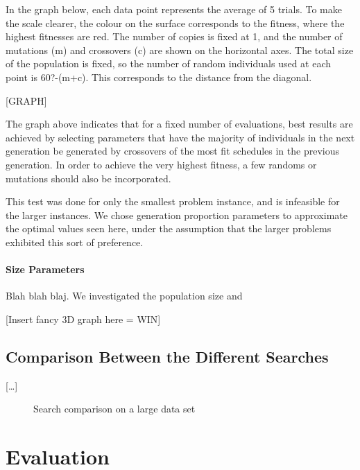 \documentclass[letterpaper]{article}
\begin{document}
        In the graph below, each data point represents the average of 5 trials. To make 
        the scale clearer, the colour on the surface corresponds to the fitness, where 
        the highest fitnesses are red. The number of copies is fixed at 1, and the number 
        of mutations (m) and crossovers (c) are shown on the horizontal axes. The total 
        size of the population is fixed, so the number of random individuals used at each 
        point is 60?-(m+c). This corresponds to the distance from the diagonal.
        
        [GRAPH]
        
        The graph above indicates that for a fixed number of evaluations, best results are 
        achieved by selecting parameters that have the majority of individuals in the next 
        generation be generated by crossovers of the most fit schedules in the previous 
        generation. In order to achieve the very highest fitness, a few randoms or mutations 
        should also be incorporated.
        
        This test was done for only the smallest problem instance, and is infeasible for the 
        larger instances. We chose generation proportion parameters to approximate the optimal 
        values seen here, under the assumption that the larger problems exhibited this sort of 
        preference.
        
      \paragraph{Size Parameters}
        Blah blah blaj. We investigated the population size and 
        
        [Insert fancy 3D graph here = WIN]
      
  \subsection{Comparison Between the Different Searches}
    [\ldots]
    \begin{figure}[h!]
  	  \centering
  	  \setlength\fboxsep{0pt}
	  \setlength\fboxrule{0.5pt}
      \caption{Search comparison on a large data set}
	\end{figure}
    
  
\section{Evaluation}
\end{document}
